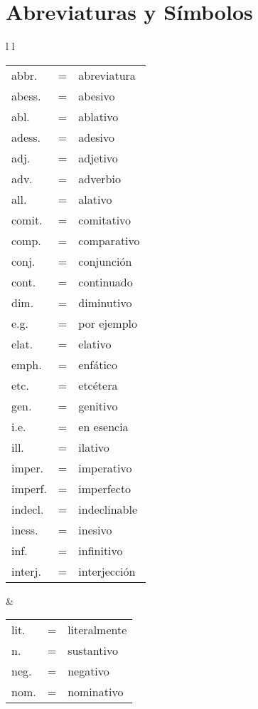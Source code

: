

\chapter*{Abreviaturas y Símbolos} %

\begin{tabular}{ l l }
	\begin{tabular}{ l c l }
	abbr.	& = & abreviatura \\
	abess.	& = & abesivo \\
	abl.	& = & ablativo \\
	adess.	& = & adesivo \\
	adj.	& = & adjetivo \\
	adv.	& = & adverbio \\
	all.	& = & alativo \\
	comit.	& = & comitativo \\
	comp.	& = & comparativo \\
	conj.	& = & conjunción \\
	cont.	& = & continuado \\
	dim.	& = & diminutivo \\
	e.g.	& = & por ejemplo \\
	elat.	& = & elativo \\
	emph.	& = & enfático \\
	etc.	& = & etcétera \\
	gen.	& = & genitivo \\
	i.e.	& = & en esencia \\
	ill.	& = & ilativo \\
	imper.	& = & imperativo \\
	imperf.	& = & imperfecto \\
	indecl.	& = & indeclinable \\
	iness.	& = & inesivo \\
	inf.	& = & infinitivo \\
	interj.	& = & interjección
	\end{tabular}
&
	\begin{tabular}{ l c l }
	lit.	& = & literalmente \\
	n.		& = & sustantivo \\
	neg.	& = & negativo \\
	nom.	& = & nominativo \\

\end{tabular}
\end{tabular}
